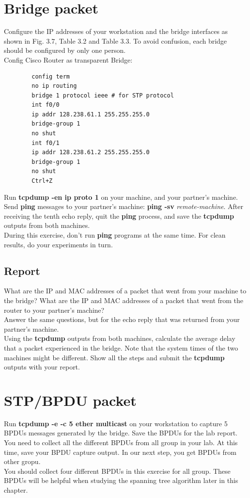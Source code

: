 \documentclass[10pt,a4paper]{article}
\numberwithin{equation}{section}
\numberwithin{figure}{section}
\numberwithin{table}{section}
\begin{document}
\section{Bridge packet}
    Configure the IP addresses of your workstation and the bridge interfaces as shown in Fig. 3.7, Table 3.2 and Table 3.3.
    To avoid confusion, each bridge should be configured by only one person. \\
    Config Cisco Router as transparent Bridge:
    \begin{verbatim}
        config term
        no ip routing
        bridge 1 protocol ieee # for STP protocol
        int f0/0
        ip addr 128.238.61.1 255.255.255.0
        bridge-group 1
        no shut
        int f0/1
        ip addr 128.238.61.2 255.255.255.0
        bridge-group 1
        no shut
        Ctrl+Z
    \end{verbatim}
    Run \textbf{tcpdump -en ip proto 1} on your machine, and your partner’s machine. Send \textbf{ping} messages to your partner’s machine: \textbf{ping -sv} \textit{remote-machine}.
    After receiving the tenth echo reply, quit the \textbf{ping} process, and save the \textbf{tcpdump} outputs from both machines. \\
    During this exercise, don’t run \textbf{ping} programs at the same time. For clean results, do your experiments in turn.
    \subsection*{Report}
    What are the IP and MAC addresses of a packet that went from your machine to the bridge?
    What are the IP and MAC addresses of a packet that went from the router to your partner’s machine? \\
    Answer the same questions, but for the echo reply that was returned from your partner’s machine. \\
    Using the \textbf{tcpdump} outputs from both machines, calculate the average delay that a packet experienced in the bridge.
    Note that the system times of the two machines might be different.
    Show all the steps and submit the \textbf{tcpdump} outputs with your report.


\section{STP/BPDU packet}
    Run \textbf{tcpdump -e -c 5 ether multicast} on your workstation to capture 5 BPDUs messages generated by the bridge.
    Save the BPDUs for the lab report. \\
    You need to collect all the different BPDUs from all group in your lab.
    At this time, save your BPDU capture output. 
    In our next step,  you get BPDUs from other gropu. \\
    You should collect four different BPDUs in this exercise for all group.
    These BPDUs will be helpful when studying the spanning tree algorithm later in this chapter.
\end{document}
